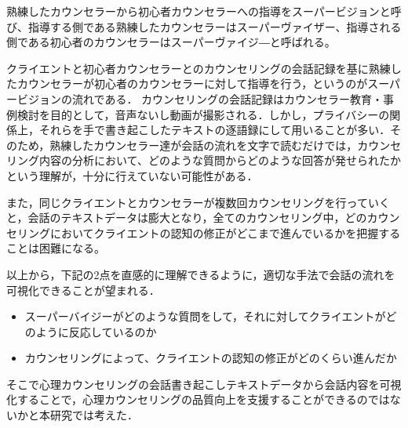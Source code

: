 \documentclass[shuuron]{kuee}
\begin{document}
熟練したカウンセラーから初心者カウンセラーへの指導をスーパービジョンと呼び、指導する側である熟練したカウンセラーはスーパーヴァイザー、指導される側である初心者のカウンセラーはスーパーヴァイジ―と呼ばれる。


クライエントと初心者カウンセラーとのカウンセリングの会話記録を基に熟練したカウンセラーが初心者のカウンセラーに対して指導を行う，というのがスーパービジョンの流れである．
カウンセリングの会話記録はカウンセラー教育・事例検討を目的として，音声ないし動画が撮影される．しかし，プライバシーの関係上，それらを手で書き起こしたテキストの逐語録にして用いることが多い．そのため，熟練したカウンセラー達が会話の流れを文字で読むだけでは，カウンセリング内容の分析において、どのような質問からどのような回答が発せられたかという理解が，十分に行えていない可能性がある．


また，同じクライエントとカウンセラーが複数回カウンセリングを行っていくと，会話のテキストデータは膨大となり，全てのカウンセリング中，どのカウンセリングにおいてクライエントの認知の修正がどこまで進んでいるかを把握することは困難になる。%


以上から，下記の2点を直感的に理解できるように，適切な手法で会話の流れを可視化できることが望まれる．
\begin{itemize}

  \item
  スーパーバイジーがどのような質問をして，それに対してクライエントがどのように反応しているのか
  \item カウンセリングによって、クライエントの認知の修正がどのくらい進んだか
\end{itemize}



そこで心理カウンセリングの会話書き起こしテキストデータから会話内容を可視化することで，心理カウンセリングの品質向上を支援することができるのではないかと本研究では考えた．
\end{document}
